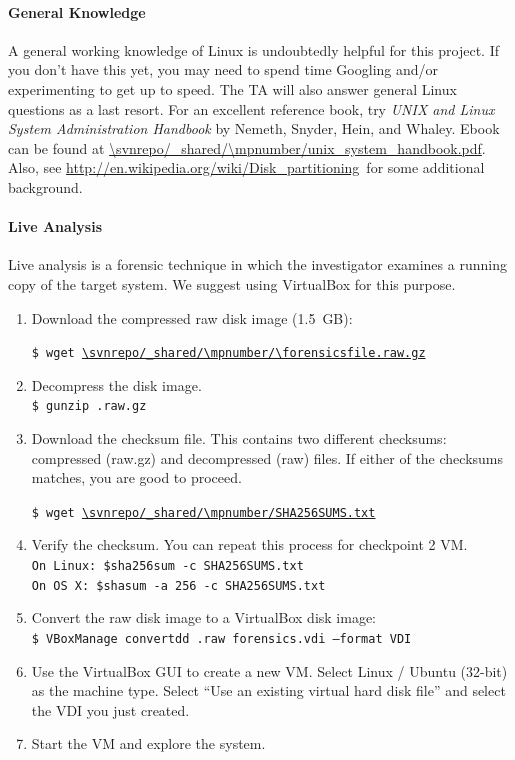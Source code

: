 \documentclass[letterpaper,12pt]{report}
\begin{document}
\paragraph{General Knowledge}
 A general working knowledge of Linux is undoubtedly helpful for this project. If you don't have this yet, you may need to spend time Googling and/or experimenting to get up to speed. The TA will also answer general Linux questions as a last resort.  For an excellent reference book, try \emph{UNIX and Linux System Administration Handbook} by Nemeth, Snyder, Hein, and Whaley.  Ebook can be found at \url{\svnrepo/\_shared/\mpnumber/unix\_system\_handbook.pdf}.  Also, see \url{http://en.wikipedia.org/wiki/Disk\_partitioning}\ for some additional background.

\paragraph{Live Analysis}
Live analysis is a forensic technique in which the investigator examines a running copy of the target system.  We suggest using VirtualBox for this purpose.

\begin{enumerate}
\item Download the compressed raw disk image (1.5~GB):
    \begin{sloppypar}
    \texttt{\$ wget \url{\svnrepo/\_shared/\mpnumber/\forensicsfile.raw.gz}}
    \end{sloppypar}
\item Decompress the disk image.\\
    \texttt{\$ gunzip \forensicsfile.raw.gz}
\item Download the checksum file. This contains two different checksums: compressed (raw.gz) and decompressed (raw) files. If either of the checksums matches, you are good to proceed.
    \begin{sloppypar}
    \texttt{\$ wget \url{\svnrepo/\_shared/\mpnumber/SHA256SUMS.txt}}
    \end{sloppypar}
\item Verify the checksum. You can repeat this process for checkpoint 2 VM.\\
    \texttt{On Linux: \$sha256sum -c SHA256SUMS.txt}\\
    \texttt{On OS X:  \$shasum -a 256 -c SHA256SUMS.txt}
\item Convert the raw disk image to a VirtualBox disk image:\\
    \texttt{\$ VBoxManage convertdd \forensicsfile.raw forensics.vdi --format VDI}
\item Use the VirtualBox GUI to create a new VM.  Select Linux / Ubuntu (32-bit) as the machine type.  Select ``Use an existing virtual hard disk file'' and select the VDI you just created.
\item Start the VM and explore the system.
\end{enumerate}
\end{document}
